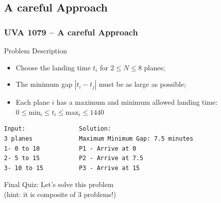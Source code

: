 \subsection{A careful Approach}
\begin{frame}[fragile]
  \frametitle{UVA 1079 -- A careful Approach}

  {\smaller
    \begin{block}{Problem Description}
      \begin{itemize}
      \item Choose the landing time $t_i$ for $2 \leq N \leq 8$ planes;
      \item The minimum gap $|t_i - t_j|$ must be as large as possible;
      \item Each plane $i$ has a maximum and minimum allowed landing time:\\
        $0 \leq \text{min}_i \leq t_i \leq \text{max}_i \leq 1440$
      \end{itemize}
    \end{block}

\begin{verbatim}
Input:               Solution:
3 planes             Maximum Minimum Gap: 7.5 minutes
1- 0 to 10           P1 - Arrive at 0
2- 5 to 15           P2 - Arrive at 7.5
3- 10 to 15          P3 - Arrive at 15
\end{verbatim}
  }

  \alert{Final Quiz:} Let's solve this problem\\
  (hint: it is composite of 3 problems!)
\end{frame}
